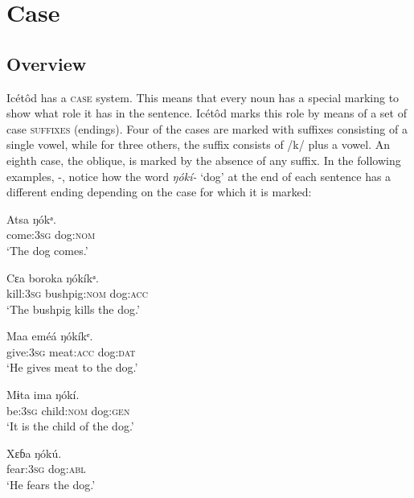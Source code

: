 \section{Case}\label{sec:7}



\subsection{Overview}\label{sec:7.1}


Icétôd has a \textsc{case} system. This means that every noun has a special marking to show what role it has in the sentence. Icétôd marks this role by means of a set of case \textsc{suffixes} (endings). Four of the cases are marked with suffixes consisting of a single vowel, while for three others, the suffix consists of /k/ plus a vowel. An eighth case, the oblique, is marked by the absence of any suffix. In the following examples, -, notice how the word \textit{ŋókí-} ‘dog’ at the end of each sentence has a different ending depending on the case for which it is marked:



 
\ea\label{ex:case:1}
\gll Atsa     ŋókᵃ. \\ 
come:\textsc{3sg}   dog:\textsc{nom}    \\
\glt ‘The dog comes.’ 
\z


 
\ea\label{ex:case:2}
\gll Cɛa     boroka     ŋókíkᵃ. \\ 
kill:\textsc{3sg}   bushpig:\textsc{nom}   dog:\textsc{acc}    \\
\glt ‘The bushpig kills the dog.’ 
\z



 
\ea\label{ex:case:3}
\gll Maa     eméá     ŋókíkᵉ. \\ 
give:\textsc{3sg}   meat:\textsc{acc}   dog:\textsc{dat}    \\
\glt ‘He gives meat to the dog.’ 
\z



 
\ea\label{ex:case:4}
\gll Mɨta     ima     ŋókí. \\ 
be:\textsc{3sg}   child:\textsc{nom}   dog:\textsc{gen}    \\
\glt ‘It is the child of the dog.’ 
\z



 
\ea\label{ex:case:5}
\gll Xɛɓa     ŋókú. \\ 
fear:\textsc{3sg}   dog:\textsc{abl}    \\
\glt ‘He fears the dog.’ 
\z


